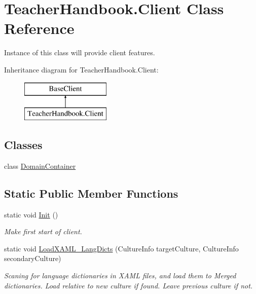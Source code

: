 \hypertarget{class_teacher_handbook_1_1_client}{}\section{Teacher\+Handbook.\+Client Class Reference}
\label{class_teacher_handbook_1_1_client}


Instance of this class will provide client features.  


Inheritance diagram for Teacher\+Handbook.\+Client\+:\begin{figure}[H]
\begin{center}
\leavevmode
\includegraphics[height=2.000000cm]{d8/de3/class_teacher_handbook_1_1_client}
\end{center}
\end{figure}
\subsection*{Classes}
\begin{DoxyCompactItemize}
\item 
class \mbox{\hyperlink{class_teacher_handbook_1_1_client_1_1_domain_container}{Domain\+Container}}
\end{DoxyCompactItemize}
\subsection*{Static Public Member Functions}
\begin{DoxyCompactItemize}
\item 
static void \mbox{\hyperlink{class_teacher_handbook_1_1_client_a8cf998f202069ab5bbbfcdc779e4af29}{Init}} ()
\begin{DoxyCompactList}\small\item\em Make first start of client. \end{DoxyCompactList}\item 
static void \mbox{\hyperlink{class_teacher_handbook_1_1_client_a863d00fe6a0ac5b86583c0a8245e07e9}{Load\+X\+A\+M\+L\+\_\+\+Lang\+Dicts}} (Culture\+Info target\+Culture, Culture\+Info secondary\+Culture)
\begin{DoxyCompactList}\small\item\em Scaning for language dictionaries in X\+A\+ML files, and load them to Merged dictionaries. Load relative to new culture if found. Leave previous culture if not. \end{DoxyCompactList}\end{DoxyCompactItemize}
